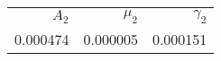 \begin{tabular}{rrr}
\toprule
    $A_2$ &   $\mu_2$ &  $\gamma_2$ \\
 0.000474 &  0.000005 &    0.000151 \\
\bottomrule
\end{tabular}
